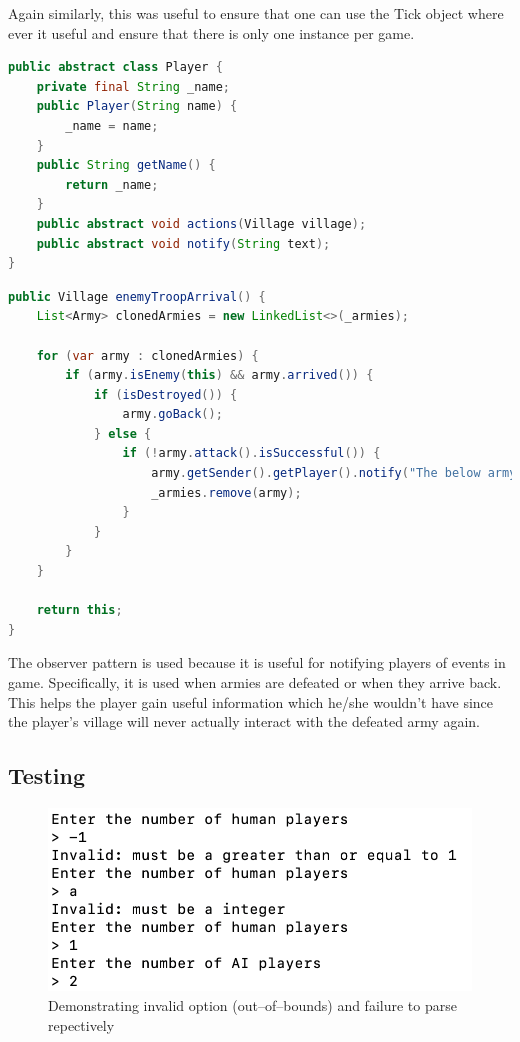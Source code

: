 \documentclass[12pt]{article}
\begin{document}
Again similarly, this was useful to ensure that one can use the
Tick object where ever it useful and ensure that there is only
one instance per game.

\begin{lstlisting}[language=Java, caption={The Player class
(contains the notify for the observer pattern)}]
public abstract class Player {
    private final String _name;
    public Player(String name) {
        _name = name;
    }
    public String getName() {
        return _name;
    }
    public abstract void actions(Village village);
    public abstract void notify(String text);
}
\end{lstlisting}

\begin{lstlisting}[language=Java, caption={\texttt{notify()}
being used to notify the player that a army has been defeated in
Village.java}]
public Village enemyTroopArrival() {
    List<Army> clonedArmies = new LinkedList<>(_armies);
    
    for (var army : clonedArmies) {
        if (army.isEnemy(this) && army.arrived()) {
            if (isDestroyed()) {
                army.goBack();
            } else {
                if (!army.attack().isSuccessful()) {
                    army.getSender().getPlayer().notify("The below army has been defeated\n" + army);
                    _armies.remove(army);
                }
            }
        }
    }
    
    return this;
}
\end{lstlisting}

The observer pattern is used because it is useful for notifying
players of events in game. Specifically, it is used when armies
are defeated or when they arrive back. This helps the player
gain useful information which he/she wouldn't have since the
player's village will never actually interact with the defeated
army again.

\subsection{Testing}

\begin{figure}[H]
    \centering
    \includegraphics[width=17cm]{./images/invalid-user-input-village-war-game.png}
    \caption{Demonstrating invalid option (out--of--bounds) and
    failure to parse repectively}
\end{figure}
\end{document}
